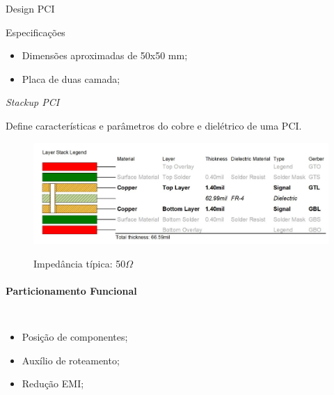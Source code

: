 \begin{frame}[allowframebreaks]{Design PCI}

    
    \begin{block}{Especificações}
    
    \begin{itemize}
        \item Dimensões aproximadas de 50x50 mm;
        \item Placa de duas camada;
    \end{itemize}
    \end{block}
    
    
    \framebreak
    
    \centering
    
    \begin{block}{\textit{Stackup PCI}}
        
        Define características e parâmetros do cobre e dielétrico de uma PCI.
    
    \end{block}
    \begin{figure}
        \centering
        
        
        \includegraphics[width=0.9\linewidth]{figuras/cap3/pcb/pcb_stackup.png}
       
        \scriptsize{Impedância típica: 50$\Omega$}
        
        \label{fig:stackup_pci}
    \end{figure}
    
    
    \framebreak
    
    \framesubtitle{{Particionamento Funcional}}
    
    \begin{columns}
        \raggedleft
        \begin{itemize}
            \item Posição de componentes;
            \item Auxílio de roteamento;
            \item Redução EMI;
        \end{itemize}
        

\end{columns}
\end{frame}
